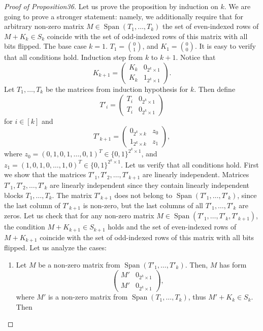 \documentclass[10pt,a4paper]{article}
\begin{document}
\begin{proof}[Proof of Proposition36]
Let us prove the proposition by induction on $k$. We are going to prove a stronger statement: namely, we additionally require that for arbitrary non-zero matrix $M\in\operatorname{Span}(T_1,\ldots,T_k)$ the set of even-indexed rows of $M+K_k\in S_k$ coincide with the set of odd-indexed rows of this matrix with all bits flipped.
The base case $k=1$. $T_1=\binom01$, and $K_1=\binom00$. It is easy to verify that all conditions hold.
Induction step from $k$ to $k+1$. Notice that
\[
K_{k+1}=\begin{pmatrix}K_k&0_{2^k\times1}\\K_k&1_{2^k\times1}\end{pmatrix}.
\]
Let $T_1,\ldots,T_k$ be the matrices from induction hypothesis for $k$. Then define
\[
T'_i=\begin{pmatrix}T_i&0_{2^k\times1}\\T_i&0_{2^k\times1}\end{pmatrix}
\]
for $i\in[k]$ and
\[
T'_{k+1}=\begin{pmatrix}0_{2^k\times k}&z_0\\1_{2^k\times k}&z_1\end{pmatrix},
\]
where $z_0=(0,1,0,1,\ldots,0,1)^T\in\{0,1\}^{2^k\times1}$, and $z_1=(1,0,1,0,\ldots,1,0)^T\in\{0,1\}^{2^k\times1}$.
Let us verify that all conditions hold. First we show that the matrices $T'_1,T'_2,\ldots,T'_{k+1}$ are linearly independent. Matrices $T'_1,T'_2,\ldots,T'_k$ are linearly independent since they contain linearly independent blocks $T_1,\ldots,T_k$. The matrix $T'_{k+1}$ does not belong to $\operatorname{Span}(T'_1,\ldots,T'_k)$, since the last column of $T'_{k+1}$ is non-zero, but the last columns of all $T'_1,\ldots,T'_k$ are zeros.
Let us check that for any non-zero matrix $M\in\operatorname{Span}(T'_1,\ldots,T'_k,T'_{k+1})$, the condition $M+K_{k+1}\in S_{k+1}$ holds and the set of even-indexed rows of $M+K_{k+1}$ coincide with the set of odd-indexed rows of this matrix with all bits flipped. Let us analyze the cases:
\begin{enumerate}
\item Let $M$ be a non-zero matrix from $\operatorname{Span}(T'_1,\ldots,T'_k)$. Then, $M$ has form
\[
\begin{pmatrix}M'&0_{2^k\times1}\\M'&0_{2^k\times1}\end{pmatrix},
\]
where $M'$ is a non-zero matrix from $\operatorname{Span}(T_1,\ldots,T_k)$, thus $M'+K_k\in S_k$. Then

\end{enumerate}
\end{proof}
\end{document}
